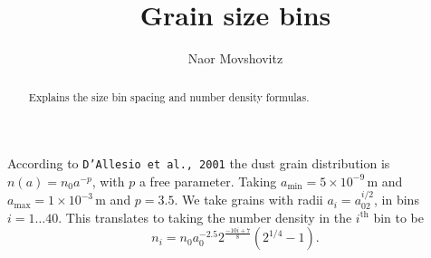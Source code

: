 \documentclass[aps,pra,preprint]{revtex4-2}
\theoremstyle{definition}
\newcommand{\unit}[1]{\,\mathrm{#1}} %
\begin{document}
\title{Grain size bins}
\author{Naor Movshovitz}

\begin{abstract}
Explains the size bin spacing and number density formulas.
\end{abstract}
\maketitle

According to \texttt{D'Allesio et al., 2001} the dust grain distribution is
$n(a)=n_0a^{-p}$, with $p$ a free parameter. Taking
$a_{\text{min}}=5\times10^{-9}\unit{m}$ and
$a_{\text{max}}=1\times10^{-3}\unit{m}$ and $p=3.5$. We take grains with radii
$a_i=a_02^{i/2}$, in bins $i=1\ldots{40}$. This translates to taking the number
density in the $i^{\text{th}}$ bin to be
\begin{equation}
n_i=n_0a_0^{-2.5}2^{\frac{-10i+7}{8}}(2^{1/4}-1).
\end{equation}
\end{document}
